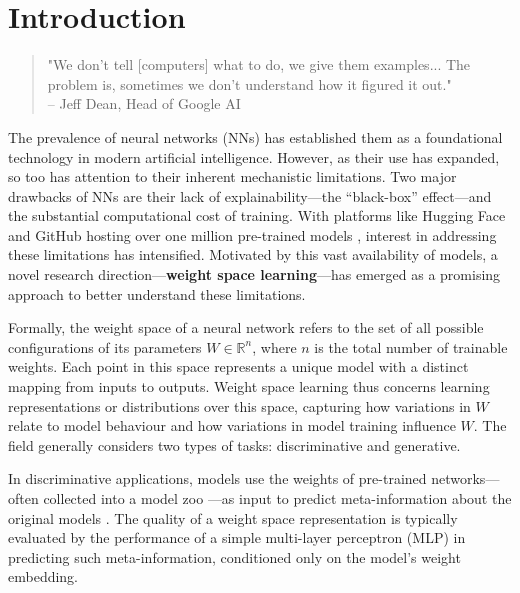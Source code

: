 
\chapter{Introduction}
\label{chap:introduction}

\begin{quote}
    "We don't tell [computers] what to do, we give them examples... The problem is, sometimes we don't understand how it figured it out."\\ %
    \vspace{0.5em} %
    \hfill -- Jeff Dean, Head of Google AI \cite{Dean2017BlackBox}
\end{quote}

The prevalence of neural networks (NNs) has established them as a foundational technology in modern artificial intelligence. However, as their use has expanded, so too has attention to their inherent mechanistic limitations. Two major drawbacks of NNs are their lack of explainability—the “black-box” effect—and the substantial computational cost of training. With platforms like Hugging Face and GitHub hosting over one million pre-trained models \cite{huggingface2024review}, interest in addressing these limitations has intensified. Motivated by this vast availability of models, a novel research direction—\textbf{weight space learning}—has emerged as a promising approach to better understand these limitations.

Formally, the weight space of a neural network refers to the set of all possible configurations of its parameters \( W \in \mathbb{R}^n \), where \( n \) is the total number of trainable weights. Each point in this space represents a unique model with a distinct mapping from inputs to outputs. Weight space learning thus concerns learning representations or distributions over this space, capturing how variations in \( W \) relate to model behaviour and how variations in model training influence \( W \). The field generally considers two types of tasks: discriminative and generative.

In discriminative applications, models use the weights of pre-trained networks—often collected into a model zoo \cite{schurholt2022modelzoosdatasetdiverse}—as input to predict meta-information about the original models \cite{unterthiner2021predictingneuralnetworkaccuracy}. The quality of a weight space representation is typically evaluated by the performance of a simple multi-layer perceptron (MLP) in predicting such meta-information, conditioned only on the model's weight embedding.

